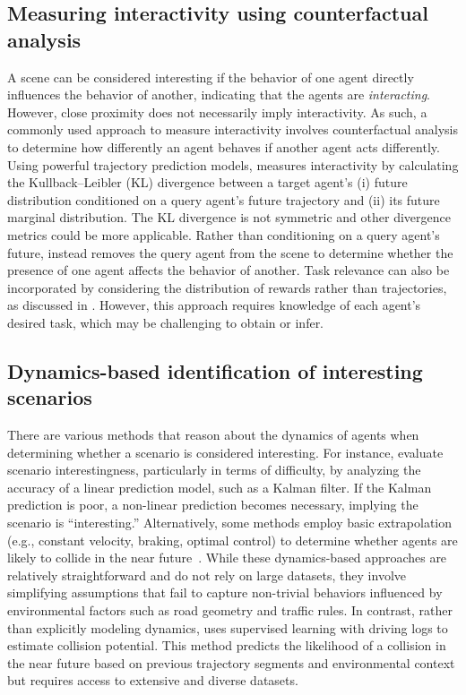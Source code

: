 \subsection{Measuring interactivity using counterfactual analysis}
A scene can be considered interesting if the behavior of one agent directly influences the behavior of another, indicating that the agents are \textit{interacting}. However, close proximity does not necessarily imply interactivity. As such, a commonly used approach to measure interactivity involves counterfactual analysis to determine how differently an agent behaves if another agent acts differently. Using powerful trajectory prediction models, \cite{tolstaya2021identifying} measures interactivity by calculating the Kullback–Leibler (KL) divergence between a target agent's (i) future distribution conditioned on a query agent's future trajectory and (ii) its future marginal distribution. The KL divergence is not symmetric and other divergence metrics could be more applicable. Rather than conditioning on a query agent's future, \cite{hsu2023interpretable, schaefer2021leveraging} instead removes the query agent from the scene to determine whether the presence of one agent affects the behavior of another. Task relevance can also be incorporated by considering the distribution of rewards rather than trajectories, as discussed in \cite{stoler2024safeshift}. However, this approach requires knowledge of each agent's desired task, which may be challenging to obtain or infer.

\subsection{Dynamics-based identification of interesting scenarios}
There are various methods that reason about the dynamics of agents when determining whether a scenario is considered interesting. For instance, \cite{makansi2021exposing,feng2024unitraj} evaluate scenario interestingness, particularly in terms of difficulty, by analyzing the accuracy of a linear prediction model, such as a Kalman filter. If the Kalman prediction is poor, a non-linear prediction becomes necessary, implying the scenario is ``interesting.'' Alternatively, some methods employ basic extrapolation (e.g., constant velocity, braking, optimal control) to determine whether agents are likely to collide in the near future~\cite{sadat2021diverse,jiang2024interhub,topan2022interaction,westhofen2023criticality,junietz2018criticality}.
While these dynamics-based approaches are relatively straightforward and do not rely on large datasets, they involve simplifying assumptions that fail to capture non-trivial behaviors influenced by environmental factors such as road geometry and traffic rules. In contrast, rather than explicitly modeling dynamics, \cite{bronstein2023embedding} uses supervised learning with driving logs to estimate collision potential. This method predicts the likelihood of a collision in the near future based on previous trajectory segments and environmental context but requires access to extensive and diverse datasets.

